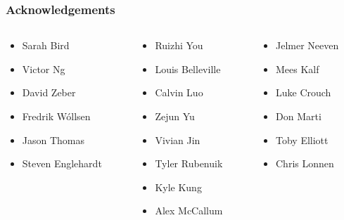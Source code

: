 \documentclass[aspectratio=169]{beamer}
\renewcommand{\LARGE}{\fontsize{31pt}{42pt}\selectfont}
\begin{document}
\begin{frame}
\frametitle{Acknowledgements}
\begin{center}
\begin{columns}[T]
  \begin{column}{.3\linewidth}
  \begin{itemize}
	\item{Sarah Bird}
	\item{Victor Ng}
	\item{David Zeber}
	\item{Fredrik W\'ollsen}
	\item{Jason Thomas}
	\item{Steven Englehardt}
  \end{itemize}
  \end{column}
\begin{column}{.3\linewidth}
  \begin{itemize}
         \item{Ruizhi You}
	\item{Louis Belleville}
	\item{Calvin Luo}
	\item{Zejun Yu}
	\item{Vivian Jin}
	\item{Tyler Rubenuik}
	\item{Kyle Kung}
	\item{Alex McCallum}
	\end{itemize}
  \end{column}
  \begin{column}{.3\linewidth}
  \begin{itemize}
        \item{Jelmer Neeven}
	\item{Mees Kalf}
	\item{Luke Crouch}
	\item{Don Marti}
	\item{Toby Elliott}  
	\item{Chris Lonnen}
	\end{itemize}
  \end{column}
\end{columns}
\end{center}
\end{frame}

\begin{frame}
\begin{center}\LARGE{https://github.com/mlopatka}\end{center}
\end{frame}
\end{document}
